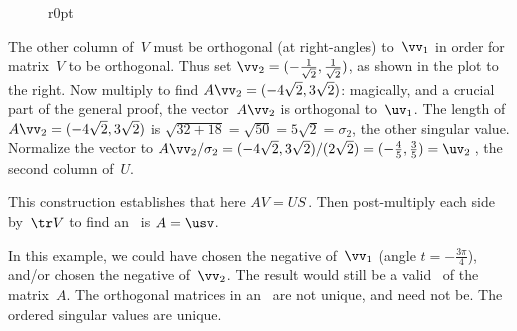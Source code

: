 \begin{example}
\begin{solution}
\begin{figure}r{0pt}
\end{figure}
The other column of~\(V\) must be orthogonal (at right-angles) to~\(\vv_1\) in order for matrix~\(V\) to be orthogonal.
Thus set \(\vv_2=(-\frac1{\sqrt2},\frac1{\sqrt2})\), as shown in the  plot to the right.
Now multiply to find \(A\vv_2=(-4\sqrt2,3\sqrt2)\):
magically, and a crucial part of the general proof, the vector~\(A\vv_2\) is orthogonal to~\(\uv_1\).
The length of \(A\vv_2=(-4\sqrt2,3\sqrt2)\) is \(\sqrt{32+18}=\sqrt{50}=5\sqrt2=\sigma_2\), the other singular value.
Normalize the vector to \(A\vv_2/\sigma_2 =(-4\sqrt2,3\sqrt2)/(2\sqrt2)=(-\frac45,\frac35)=\uv_2\)\,, the second column of~\(U\).

This construction establishes that here \(AV=US\)\,. 
Then post-multiply each side by~\(\tr V\) to find an \svd\ is \(A=\usv\).

In this example, we could have chosen the negative of~\(\vv_1\) (angle \(t=-\frac{3\pi}4\)), and/or chosen the negative of~\(\vv_2\). 
The result would still be a valid \svd\ of the matrix~\(A\).
The orthogonal matrices in an \svd\ are not unique, and need not be. The ordered singular values are unique.
\end{solution}
\end{example}





